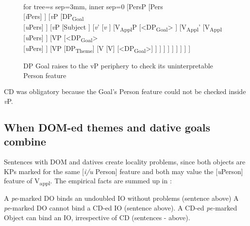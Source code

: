 \documentclass[output=paper,colorlinks,citecolor=brown,nonflat]{langsci/langscibook}
\begin{document}
 \begin{figure}%
	\begin{forest}
	for tree={s sep=3mm, inner sep=0}
		[PersP
			[Pers\\
				{[}\textit{i}Pers{]}
			]
			[\textit{v}P
				[DP\textsubscript{Goal}\\
					{[}\textit{u}Pers{]}
				]
				[\textit{v}P
					[Subject
					]
					[\textit{v}’
						[\textit{v}
						]
						[V\textsubscript{Appl}P
							[<DP\textsubscript{Goal}>
							]
							[V\textsubscript{Appl}'
								[V\textsubscript{Appl}\\
								 {[}\textit{u}Pers{]}
								]
								[VP
									[<DP\textsubscript{Goal}>\\
									 {[}\textit{u}Pers{]}
									]
									[VP
                                                                                    [DP\textsubscript{Theme}]
                                                                                    [V
                                                                                            [V]
                                                                                            [<DP\textsubscript{Goal}>]
                                                                                    ]
									]
								]
							]
						]
					]
				]
			]
		]
 	\end{forest}
	\caption{\label{fig:cornilescu:10} DP Goal raises to the vP periphery to check its uninterpretable Person feature}
\end{figure}

CD was obligatory because the Goal’s Person feature could not be checked inside \textit{v}P.

\subsection{{When} {DOM-ed} {themes} {and} {dative} {goals} {combine}}%

Sentences with DOM and datives create locality problems, since both objects are KPs marked for the same [\textit{i/u} Person] feature and both may value the [\textit{u}Person] feature of V\textsubscript{appl}. The empirical facts are summed up in :

\ea%
   \label{ex:cornilescu:30}
  	\ea A \textit{pe}-marked DO binds an undoubled IO without problems (sentence  above) \label{ex:cornilescu:30a}
  	\ex A \textit{pe}-marked DO cannot bind a CD-ed IO (sentence  above). \label{ex:cornilescu:30b}
  	\ex A CD-ed \textit{pe-}marked Object can bind an IO, irrespective of CD (sentences - above). \label{ex:cornilescu:30c}
   \z
   \z
\end{document}
